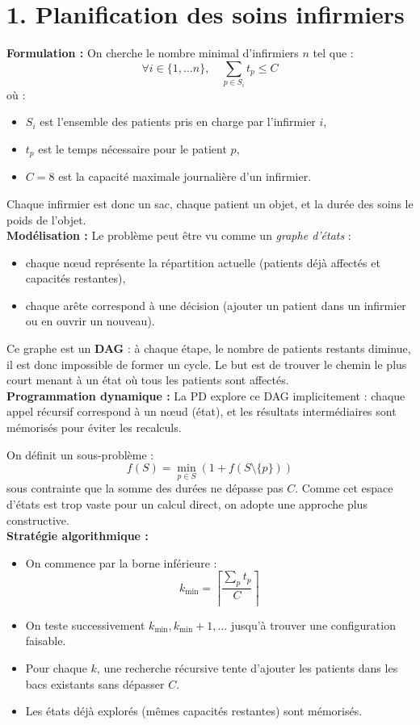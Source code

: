 
\section*{1. Planification des soins infirmiers}

\textbf{Formulation : } 
On cherche le nombre minimal d'infirmiers $n$ tel que :
\[
\forall i \in \{1, ...n\}, \quad \sum_{p \in S_i} t_p \leq C
\]
où :
\begin{itemize}
    \item $S_i$ est l’ensemble des patients pris en charge par l’infirmier $i$,
    \item $t_p$ est le temps nécessaire pour le patient $p$,
    \item $C=8$ est la capacité maximale journalière d'un infirmier.
\end{itemize}

Chaque infirmier est donc un sac, chaque patient un objet, et la durée des soins le poids de l’objet. \\

\textbf{Modélisation :} 
Le problème peut être vu comme un \textit{graphe d’états} :
\begin{itemize}
    \item chaque nœud représente la répartition actuelle (patients déjà affectés et capacités restantes),
    \item chaque arête correspond à une décision (ajouter un patient dans un infirmier ou en ouvrir un nouveau).
\end{itemize}

Ce graphe est un \textbf{DAG} :
à chaque étape, le nombre de patients restants diminue, il est donc impossible de former un cycle.
Le but est de trouver le chemin le plus court menant à un état où tous les patients sont affectés. \\

\textbf{Programmation dynamique :} 
La PD explore ce DAG implicitement : chaque appel récursif correspond à un nœud (état), et les résultats intermédiaires sont mémorisés pour éviter les recalculs.

On définit un sous-problème :
\[
f(S) = \min_{p \in S} \left(1 + f(S \setminus \{p\})\right)
\]
sous contrainte que la somme des durées ne dépasse pas $C$. 
Comme cet espace d’états est trop vaste pour un calcul direct, on adopte une approche plus constructive. \\

\textbf{Stratégie algorithmique :}
\begin{itemize}
    \item On commence par la borne inférieure :
    \[
    k_{\min} = \left\lceil \frac{\sum_p t_p}{C} \right\rceil
    \]
    \item On teste successivement $k_{\min}, k_{\min}+1, ...$ jusqu’à trouver une configuration faisable.
    \item Pour chaque $k$, une recherche récursive tente d’ajouter les patients dans les bacs existants sans dépasser $C$.
    \item Les états déjà explorés (mêmes capacités restantes) sont mémorisés.
\end{itemize}

